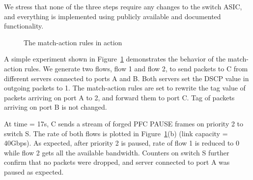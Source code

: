 We stress that none of the three steps require any changes to the switch ASIC,
and everything is implemented using publicly available and documented
functionality.

\begin{figure}[t]
	\centering
	
	
	\caption{The match-action rules in action}\label{fig:tagger_demon}
\end{figure}


  A simple experiment shown in
Figure~\ref{fig:tagger_demon} demonstrates the behavior of the match-action
rules.  We generate two flows, flow 1 and flow 2, to send packets to C from
different servers connected to ports A and B. Both servers set the DSCP value in
outgoing packets to 1. The match-action rules are set to rewrite the tag value
of packets arriving on port A to 2, and forward them to port C. Tag of packets
arriving on port B is not changed.
 
At time = 17s, C sends a stream of forged PFC PAUSE frames on priority 2 to
switch S. The rate of both flows is plotted in Figure~\ref{fig:tagger_demon}(b)
(link capacity = 40Gbps). As expected, after priority 2 is paused, rate of
flow 1 is reduced to 0 while flow 2 gets all the available bandwidth. 
Counters on switch S further confirm that no packets were dropped, and server
connected to port A was paused as expected.
